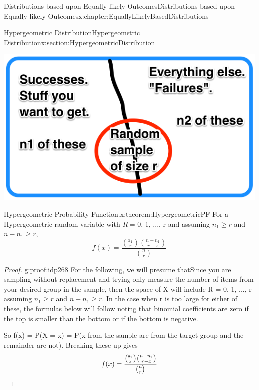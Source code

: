 \documentclass[oneside,10pt,]{book}
\newcommand{\qedhere}{\relax}
\numberwithin{equation}{section}
\begin{document}
\begin{chapterptx}{Distributions based upon Equally likely Outcomes}{}{Distributions based upon Equally likely Outcomes}{}{}{x:chapter:EquallyLikelyBasedDistributions}
\begin{sectionptx}{Hypergeometric Distribution}{}{Hypergeometric Distribution}{}{}{x:section:HypergeometricDistribution}
\par
\begin{image}{0.2}{0.6}{0.2}%
\includegraphics[width=\linewidth]{images/HypergeometricBucket.png}
\end{image}%
%
\par
\begin{theorem}{Hypergeometric Probability Function.}{}{x:theorem:HypergeometricPF}%
For a Hypergeometric random variable with \(R\) = \textbraceleft{}0, 1, ..., r\textbraceright{} and assuming \(n_1 \ge r\) and \(n-n_1 \ge r\),%
\begin{equation*}
f(x) = \frac{\binom{n_1}{x} \binom{n-n_1}{r-x}}{\binom{n}{r}}
\end{equation*}
%
\end{theorem}
\begin{proof}{}{g:proof:idp268}
For the following, we will presume thatSince you are sampling without replacement and trying only measure the number of items from your desired group in the sample, then the space of X will include R = \textbraceleft{}0, 1, ..., r\textbraceright{} assuming \(n_1 \ge r\) and \(n-n_1 \ge r\). In the case when r is too large for either of these, the formulas below will follow noting that binomial coefficients are zero if the top is smaller than the bottom or if the bottom is negative.%
\par
So f(x) = P(X = x) = P(x from the sample are from the target group and the remainder are not). Breaking these up gives%
\begin{equation*}
f(x) = \frac{\binom{n_1}{x} \binom{n-n_1}{r-x}}{\binom{n}{r}}\qedhere
\end{equation*}
%
\end{proof}
%
\par

\end{sectionptx}
\end{chapterptx}
\end{document}
